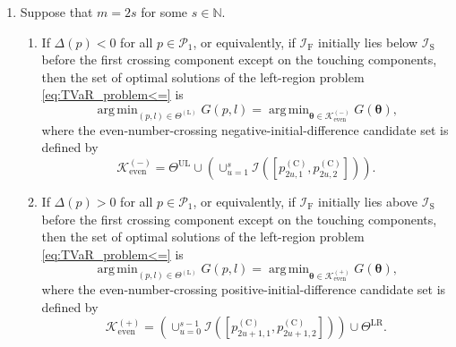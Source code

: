 \documentclass[a4paper,12pt]{article}
\DeclareMathOperator*{\argmin}{arg\,min}
\begin{document}
\begin{proposition}
\begin{enumerate}
\item[(ii)] Suppose that $m=2s$ for some $s\in\mathbb{N}$.

\begin{enumerate}
\item[(a)] If $\Delta\left(p\right)<0$ for all $p\in\mathcal{P}_1$, or equivalently, if $\mathcal{I}_{\text{F}}$ initially lies below $\mathcal{I}_{\text{S}}$ before the first crossing component except on the touching components, then the set of optimal solutions of the left-region problem \eqref{eq:TVaR_problem<=} is
\begin{equation*}
\argmin_{\left(p,l\right)\in\Theta^{\left(\text{L}\right)}}G\left(p,l\right)=\argmin_{{\bm\theta}\in\mathcal{K}_{\text{even}}^{\left(-\right)}}G\left({\bm\theta}\right),
\end{equation*}
where the even-number-crossing negative-initial-difference candidate set is defined by
\begin{equation*}
\mathcal{K}_{\text{even}}^{\left(-\right)}=\Theta^{\text{UL}}\cup\left(\cup_{u=1}^{s}\mathcal{I}\left(\left[p^{\left(\text{C}\right)}_{2u,1},p^{\left(\text{C}\right)}_{2u,2}\right]\right)\right).
\end{equation*}

\item[(b)] If $\Delta\left(p\right)>0$ for all $p\in\mathcal{P}_1$, or equivalently, if $\mathcal{I}_{\text{F}}$ initially lies above $\mathcal{I}_{\text{S}}$ before the first crossing component except on the touching components, then the set of optimal solutions of the left-region problem \eqref{eq:TVaR_problem<=} is
\begin{equation*}
\argmin_{\left(p,l\right)\in\Theta^{\left(\text{L}\right)}}G\left(p,l\right)=\argmin_{{\bm\theta}\in\mathcal{K}_{\text{even}}^{\left(+\right)}}G\left({\bm\theta}\right),
\end{equation*}
where the even-number-crossing positive-initial-difference candidate set is defined by
\begin{equation*}
\mathcal{K}_{\text{even}}^{\left(+\right)}=\left(\cup_{u=0}^{s-1}\mathcal{I}\left(\left[p^{\left(\text{C}\right)}_{2u+1,1},p^{\left(\text{C}\right)}_{2u+1,2}\right]\right)\right)\cup\Theta^{\text{LR}}.
\end{equation*}
\end{enumerate}
\end{enumerate}
\end{proposition}
\end{document}
